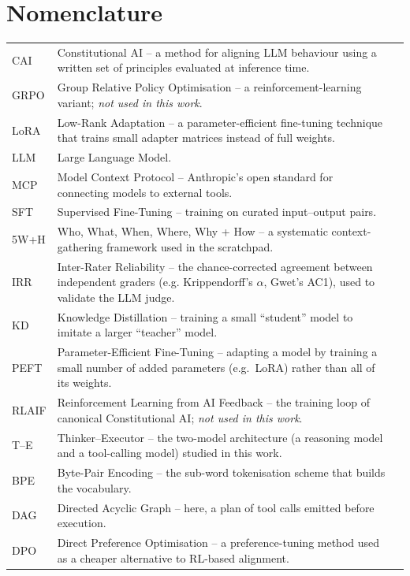 \documentclass[a4paper,oneside,12pt]{book}
\numberwithin{equation}{chapter} %
\numberwithin{algorithm}{chapter} %
\begin{document}
\section*{\Huge\textcolor{tcd_blue}{Nomenclature}}
\begin{tabular}{lp{15cm}l}
CAI     & Constitutional AI -- a method for aligning LLM behaviour using a written set of principles evaluated at inference time. \\
GRPO    & Group Relative Policy Optimisation -- a reinforcement-learning variant; \emph{not used in this work}. \\
LoRA    & Low-Rank Adaptation -- a parameter-efficient fine-tuning technique that trains small adapter matrices instead of full weights. \\
LLM     & Large Language Model. \\
MCP     & Model Context Protocol -- Anthropic's open standard for connecting models to external tools. \\
SFT     & Supervised Fine-Tuning -- training on curated input--output pairs. \\
5W+H    & Who, What, When, Where, Why + How -- a systematic context-gathering framework used in the scratchpad. \\
IRR     & Inter-Rater Reliability -- the chance-corrected agreement between independent graders (e.g. Krippendorff's $\alpha$, Gwet's AC1), used to validate the LLM judge. \\
KD      & Knowledge Distillation -- training a small ``student'' model to imitate a larger ``teacher'' model. \\
PEFT    & Parameter-Efficient Fine-Tuning -- adapting a model by training a small number of added parameters (e.g.\ LoRA) rather than all of its weights. \\
RLAIF   & Reinforcement Learning from AI Feedback -- the training loop of canonical Constitutional AI; \emph{not used in this work}. \\
T--E    & Thinker--Executor -- the two-model architecture (a reasoning model and a tool-calling model) studied in this work. \\
BPE     & Byte-Pair Encoding -- the sub-word tokenisation scheme that builds the vocabulary. \\
DAG     & Directed Acyclic Graph -- here, a plan of tool calls emitted before execution. \\
DPO     & Direct Preference Optimisation -- a preference-tuning method used as a cheaper alternative to RL-based alignment. \\

\end{tabular}
\end{document}
